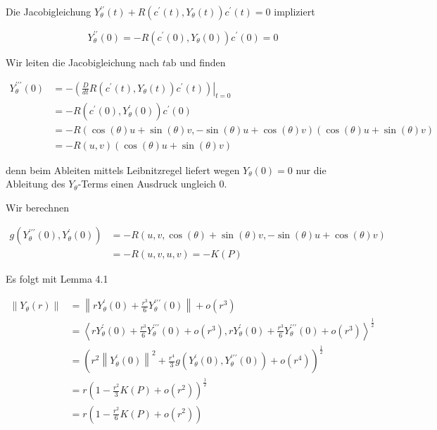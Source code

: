 \documentclass[10pt, letterpaper]{article}
\begin{document}
Die Jacobigleichung $Y_{\theta}^{\prime \prime}(t)+R\left(c^{\prime}(t), Y_{\theta}(t)\right) c^{\prime}(t)=0$ impliziert

$$
Y_{\theta}^{\prime \prime}(0)=-R\left(c^{\prime}(0), Y_{\theta}(0)\right) c^{\prime}(0)=0
$$

Wir leiten die Jacobigleichung nach $t \mathrm{ab}$ und finden

$$
\begin{aligned}
Y_{\theta}^{\prime \prime \prime}(0) & =-\left.\left(\frac{D}{d t} R\left(c^{\prime}(t), Y_{\theta}(t)\right) c^{\prime}(t)\right)\right|_{t=0} \\
& =-R\left(c^{\prime}(0), Y_{\theta}^{\prime}(0)\right) c^{\prime}(0) \\
& =-R(\cos (\theta) u+\sin (\theta) v,-\sin (\theta) u+\cos (\theta) v)(\cos (\theta) u+\sin (\theta) v) \\
& =-R(u, v)(\cos (\theta) u+\sin (\theta) v)
\end{aligned}
$$

denn beim Ableiten mittels Leibnitzregel liefert wegen $Y_{\theta}(0)=0$ nur die Ableitung des $Y_{\theta}$-Terms einen Ausdruck ungleich 0.

Wir berechnen

$$
\begin{aligned}
g\left(Y_{\theta}^{\prime \prime \prime}(0), Y_{\theta}^{\prime}(0)\right) & =-R(u, v, \cos (\theta)+\sin (\theta) v,-\sin (\theta) u+\cos (\theta) v) \\
& =-R(u, v, u, v)=-K(P)
\end{aligned}
$$

Es folgt mit Lemma 4.1

$$
\begin{aligned}
\left\|Y_{\theta}(r)\right\| & =\left\|r Y_{\theta}^{\prime}(0)+\frac{r^{3}}{6} Y_{\theta}^{\prime \prime \prime}(0)\right\|+o\left(r^{3}\right) \\
& =\left\langle r Y_{\theta}^{\prime}(0)+\frac{r^{3}}{6} Y_{\theta}^{\prime \prime \prime}(0)+o\left(r^{3}\right), r Y_{\theta}^{\prime}(0)+\frac{r^{3}}{6} Y_{\theta}^{\prime \prime \prime}(0)+o\left(r^{3}\right)\right\rangle^{\frac{1}{2}} \\
& =\left(r^{2}\left\|Y_{\theta}^{\prime}(0)\right\|^{2}+\frac{r^{4}}{3} g\left(Y_{\theta}^{\prime}(0), Y_{\theta}^{\prime \prime \prime}(0)\right)+o\left(r^{4}\right)\right)^{\frac{1}{2}} \\
& =r\left(1-\frac{r^{2}}{3} K(P)+o\left(r^{2}\right)\right)^{\frac{1}{2}} \\
& =r\left(1-\frac{r^{2}}{6} K(P)+o\left(r^{2}\right)\right)
\end{aligned}
$$
\end{document}
